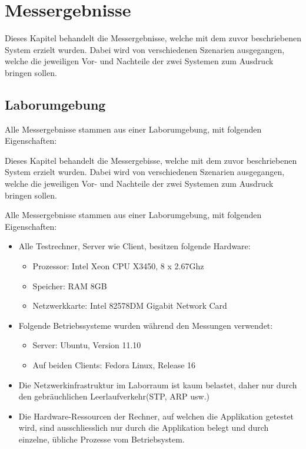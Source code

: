 \chapter{Messergebnisse}

Dieses Kapitel be\-han\-delt die Mess\-er\-geb\-nis\-se, welche mit dem zu\-vor be\-schrie\-be\-nen System erzielt wurden. Dabei wird von verschiedenen Sze\-narien aus\-ge\-gang\-en, welche die jeweiligen Vor- und Nach\-teile der zwei Sy\-stem\-en zum Ausdruck bringen sollen. 

\section{Laborumgebung}

Alle Messergebnisse stammen aus einer La\-bor\-um\-gebung, mit fol\-gen\-den Ei\-gen\-schaf\-ten:

Dieses Kapitel be\-handelt die Mes\-ser\-ge\-bis\-se, welche mit dem zuvor be\-schrie\-benen System erzielt wurden. Dabei wird von verschiedenen Szenarien ausgegangen, welche die jeweiligen Vor- und Nachteile der zwei Systemen zum Ausdruck bringen sollen.


Alle Mes\-ser\-ge\-bnis\-se stam\-men aus einer Labor\-umgebung, mit folgenden Ei\-gen\-schaf\-ten:

\begin{itemize}
\item Alle Testrechner, Server wie Client, besitzen folgende Hardware:
\begin{itemize}
\item Prozessor: Intel Xeon CPU X3450, 8 x 2.67Ghz
\item Speicher: RAM 8GB
\item Netzwerkkarte: Intel 82578DM Gigabit Network Card
\end{itemize}
\item Folgende Betriebssysteme wurden während den Messungen verwendet:
\begin{itemize}
\item Server: Ubuntu, Version 11.10
\item Auf beiden Clients: Fedora Linux, Release 16
\end{itemize}
\item Die Netzwerkinfrastruktur im Laborraum ist kaum belastet, daher nur durch den gebräuchlichen Leerlaufverkehr(\gls{STP}, \gls{ARP} usw.)
\item Die Hardware-Ressourcen der Rechner, auf welchen die Applikation getestet wird, sind ausschliesslich nur durch die Applikation belegt und durch einzelne, übliche Prozesse vom  Betriebsystem.
\end{itemize}

